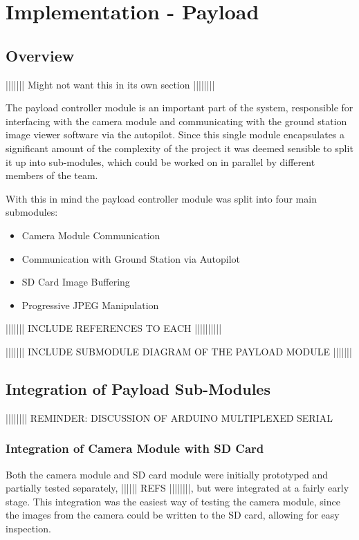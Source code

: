 \chapter{Implementation - Payload}


\section{Overview}
||||||| Might not want this in its own section ||||||||

The payload controller module is an important part of the system, responsible
for interfacing with the camera module and communicating with the ground 
station image viewer software via the autopilot. Since this single module 
encapsulates a significant amount of the complexity of the project it was 
deemed sensible to split it up into sub-modules, which could be worked on in
parallel by different members of the team. 

With this in mind the payload controller module was split into four main 
submodules:

\begin{itemize}
	\item Camera Module Communication
	\item Communication with Ground Station via Autopilot
	\item SD Card Image Buffering
	\item Progressive JPEG Manipulation
\end{itemize}

||||||| INCLUDE REFERENCES TO EACH ||||||||||

||||||| INCLUDE SUBMODULE DIAGRAM OF THE PAYLOAD MODULE |||||||







\section{Integration of Payload Sub-Modules}

|||||||| REMINDER: DISCUSSION OF ARDUINO MULTIPLEXED SERIAL

\subsection{Integration of Camera Module with SD Card}
Both the camera module and SD card module were initially prototyped and 
partially tested separately, |||||| REFS ||||||||, but were integrated at
a fairly early stage. This integration was the easiest way of testing the 
camera module, since the images from the camera could be written to the SD
card, allowing for easy inspection.

